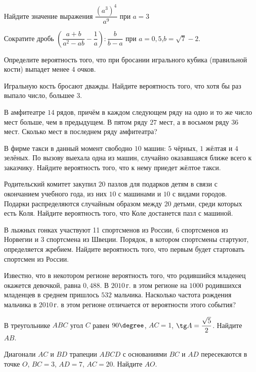 \begin{class}[number=6]
	\begin{listofex}
		\item Найдите значение выражения \( \dfrac{(a^{3})^{4}}{a^{9}} \) при \( a=3 \)
		\item Сократите дробь \( \left( \dfrac{a+b}{a^{2}-ab}-\dfrac{1}{a} \right):\dfrac{b}{b-a} \) при \( a=0,5 \),\( b=\sqrt{7}-2 \).
		\item Определите вероятность того, что при бросании игрального кубика (правильной кости) выпадет менее \( 4 \) очков.
		\item Игральную кость бросают дважды. Найдите вероятность того, что хотя бы раз выпало число, большее \( 3 \).
		\item В амфитеатре \( 14 \) рядов, причём в каждом следующем ряду на одно и то же число мест больше, чем в предыдущем. В пятом ряду \( 27 \) мест, а в восьмом ряду \( 36 \) мест. Сколько мест в последнем ряду амфитеатра?
		
		\item В фирме такси в данный момент свободно \( 10 \) машин: \( 5 \) чёрных, \(  1 \) жёлтая
		и \( 4 \) зелёных. По вызову выехала одна из машин, случайно оказавшаяся
		ближе всего к заказчику. Найдите вероятность того, что к нему приедет жёлтое такси.
		
		\item Родительский комитет закупил \( 20 \) пазлов для подарков детям в связи
		с окончанием учебного года, из них \( 10 \) с машинами и \( 10 \) с видами городов. Подарки распределяются случайным образом между \( 20 \) детьми, среди которых есть Коля. Найдите вероятность того, что Коле достанется пазл
		с машиной.
		
		\item В лыжных гонках участвуют 11 спортсменов из России, 6 спортсменов
		из Норвегии и 3 спортсмена из Швеции. Порядок, в котором спортсмены стартуют, определяется жребием. Найдите вероятность того, что первым будет стартовать спортсмен из России.
		\item Известно, что в некотором регионе вероятность того, что родившийся младенец окажется девочкой, равна \( 0,488 \). В \( 2010 \) г. в этом регионе на \( 1000 \) родившихся младенцев в среднем пришлось \( 532  \) мальчика. Насколько частота рождения мальчика в \( 2010 \) г. в этом регионе отличается от вероятности этого события?
		\item В треугольнике \( ABC \) угол \( C \) равен \( 90\degree \), \( AC = 1 \), \( \tg A =  \dfrac{\sqrt{5}}{2}\).  Найдите \( AB \).
		\item Диагонали \( AC \) и \( BD \) трапеции \( ABCD \) с основаниями \( BC \) и \( AD \) пересекаются в точке \( O \), \( BC  =  3 \), \( AD  =  7 \), \( AC  =  20 \). Найдите \( AO \).
		

\end{listofex}
\end{class}
